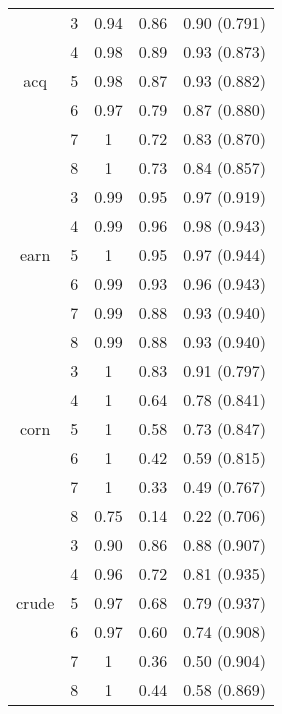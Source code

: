 \begin{table}[]
{\begin{tabular}{| c | c | c | c | c | }
		& 3 & 0.94 & 0.86 & 0.90 (0.791)    \\ 
		& 4 & 0.98 & 0.89 &  0.93 (0.873)   \\
		acq	& 5 & 0.98 & 0.87 & 0.93  (0.882)   \\ 
		& 6 & 0.97 & 0.79 & 0.87  (0.880)   \\
		& 7 & 1 & 0.72 & 0.83  (0.870)   \\
		& 8 & 1 & 0.73 & 0.84  (0.857)   \\
		\hline
		
		
		
		& 3 & 0.99 & 0.95 &  0.97 (0.919)   \\ 
		& 4 & 0.99 & 0.96 &  0.98 (0.943)   \\ 
		earn & 5 & 1 & 0.95 &  0.97  (0.944)  \\ 
		& 6 & 0.99 & 0.93 &  0.96  (0.943)  \\ 
		& 7 & 0.99 & 0.88 &  0.93  (0.940)  \\ 
		& 8 & 0.99 & 0.88 &  0.93  (0.940)  \\ \hline
		
		
		
		& 3 & 1 & 0.83 & 0.91  (0.797)   \\ 
		& 4 & 1 & 0.64 & 0.78  (0.841)   \\ 
		corn	& 5 & 1 & 0.58 &  0.73 (0.847)   \\ 
		& 6 & 1 & 0.42 & 0.59  (0.815)   \\ 
		& 7 & 1 & 0.33 & 0.49  (0.767)  \\ 
		& 8 & 0.75 & 0.14 & 0.22  (0.706)   \\ \hline
		
		
		& 3 & 0.90 & 0.86 &  0.88  (0.907)  \\ 
		& 4 & 0.96 & 0.72 & 0.81  (0.935)   \\ 
		crude & 5 & 0.97 & 0.68 &  0.79 (0.937)   \\ 
		& 6 & 0.97 & 0.60 &  0.74 (0.908)   \\
		& 7 & 1 & 0.36 &  0.50 (0.904)   \\
		& 8 & 1 & 0.44 &  0.58  (0.869)  \\ \hline
		
		
		
\end{tabular}} 

\end{table}
